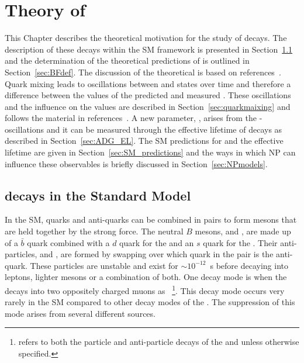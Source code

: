 \chapter{{\bf Theory of }}
\label{sec:theory_chptr}
This Chapter describes the theoretical motivation for the study of \bmumu decays. 
The description of these decays within the SM framework is presented in Section~\ref{sec:bsmumu_in_SM} and the determination of the theoretical predictions of \BFs is outlined in Section~\ref{sec:BFdef}.
The discussion of the theoretical \BFs is based on references~\cite{Blake:2016olu,Anikeev:2001rk}. 
Quark mixing leads to oscillations between \bs and \barbs states over time and therefore a difference between the values of the predicted and measured \bsmumu \BFs. These oscillations and the influence on the \BFs values are described in Section~\ref{sec:quarkmaixing} and follows the material in references~\cite{Dunietz:2000cr, Anikeev:2001rk,Nierste:2009wg}. 
A new parameter, \ADG, arises from the \bs - \barbs oscillations and it can be measured through the effective lifetime of \bsmumu decays as described in Section~\ref{sec:ADG_EL}. The SM predictions for \bmumu \BFs and the \bsmumu effective lifetime are given in Section~\ref{sec:SM_predictions} and the ways in which NP can influence these observables is briefly discussed in Section~\ref{sec:NPmodels}.



\section[$B^0_{(s)}\to \mu^+ \mu^-$ decays in the Standard Model]{ decays in the Standard Model}
\label{sec:bsmumu_in_SM}
In the SM, quarks and anti-quarks can be combined in pairs to form mesons that are held together by the strong force. The neutral $B$ mesons, \bd and \bs, are made up of a $\bar{b}$ quark combined with a $d$ quark for the \bd and an $s$ quark for the \bs. Their anti-particles, \barbd and \barbs, are formed by swapping over which quark in the pair is the anti-quark. These particles are unstable and exist for $\sim10^{-12}$~s before decaying into leptons, lighter mesons or a combination of both. One decay mode is when the \bsd decays into two oppositely charged muons as \bmumu~\footnote{\bmumu refers to both the particle and anti-particle decays of the \bd and \bs unless otherwise specified.}. This decay mode occurs very rarely in the SM compared to other decay modes of the \bsd. The suppression of this mode arises from several different sources.

